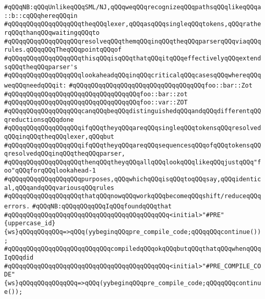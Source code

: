 \newline
\newline
\verb|#qQQqNB:qQQqUnlikeqQQqSML/NJ,qQQqweqQQqrecognizeqQQqpathsqQQqlikeqQQqa::b::cqQQqhereqQQqin|\newline
\verb|#qQQqqQQqqQQqqQQqqQQqtheqQQqlexer,qQQqasqQQqsingleqQQqtokens,qQQqratherqQQqthanqQQqwaitingqQQqto|\newline
\verb|#qQQqqQQqqQQqqQQqqQQqresolveqQQqthemqQQqinqQQqtheqQQqparserqQQqviaqQQqrules.qQQqqQQqTheqQQqpointqQQqof|\newline
\verb|#qQQqqQQqqQQqqQQqqQQqthisqQQqisqQQqthatqQQqitqQQqeffectivelyqQQqextendsqQQqtheqQQqparser's|\newline
\verb|#qQQqqQQqqQQqqQQqqQQqlookaheadqQQqinqQQqcriticalqQQqcasesqQQqwhereqQQqweqQQqneedqQQqit:|\newline
\verb|#qQQqqQQqqQQqqQQqqQQqqQQqqQQqqQQqqQQqfoo::bar::Zot|\newline
\verb|#qQQqqQQqqQQqqQQqqQQqqQQqqQQqqQQqqQQqfoo::bar::zot|\newline
\verb|#qQQqqQQqqQQqqQQqqQQqqQQqqQQqqQQqqQQqfoo::var::ZOT|\newline
\verb|#qQQqqQQqqQQqqQQqqQQqcanqQQqbeqQQqdistinguishedqQQqandqQQqdifferentqQQqreductionsqQQqdone|\newline
\verb|#qQQqqQQqqQQqqQQqqQQqifqQQqtheyqQQqareqQQqsingleqQQqtokensqQQqresolvedqQQqinqQQqtheqQQqlexer,qQQqbut|\newline
\verb|#qQQqqQQqqQQqqQQqqQQqifqQQqtheyqQQqareqQQqsequencesqQQqofqQQqtokensqQQqresolvedqQQqinqQQqtheqQQqparser,|\newline
\verb|#qQQqqQQqqQQqqQQqqQQqthenqQQqtheyqQQqallqQQqlookqQQqlikeqQQqjustqQQq"foo"qQQqforqQQqlookahead-1|\newline
\verb|#qQQqqQQqqQQqqQQqqQQqpurposes,qQQqwhichqQQqisqQQqtoqQQqsay,qQQqidentical,qQQqandqQQqvariousqQQqrules|\newline
\verb|#qQQqqQQqqQQqqQQqqQQqthatqQQqnowqQQqworkqQQqbecomeqQQqshift/reduceqQQqerrors.|\newline
\newline
\verb|#qQQqNB:qQQqqQQqqQQqIqQQqfoundqQQqthat|\newline
\verb|#qQQqqQQqqQQqqQQqqQQqqQQqqQQqqQQqqQQqqQQqqQQq<initial>"#PRE"{uppercase_id}{ws}qQQqqQQqqQQq=>qQQq(yybeginqQQqpre_compile_code;qQQqqQQqcontinue());|\newline
\verb|#qQQqqQQqqQQqqQQqqQQqqQQqqQQqcompiledqQQqokqQQqbutqQQqthatqQQqwhenqQQqIqQQqdid|\newline
\verb|#qQQqqQQqqQQqqQQqqQQqqQQqqQQqqQQqqQQqqQQqqQQq<initial>"#PRE_COMPILE_CODE"{ws}qQQqqQQqqQQqqQQq=>qQQq(yybeginqQQqpre_compile_code;qQQqqQQqcontinue());|\newline
